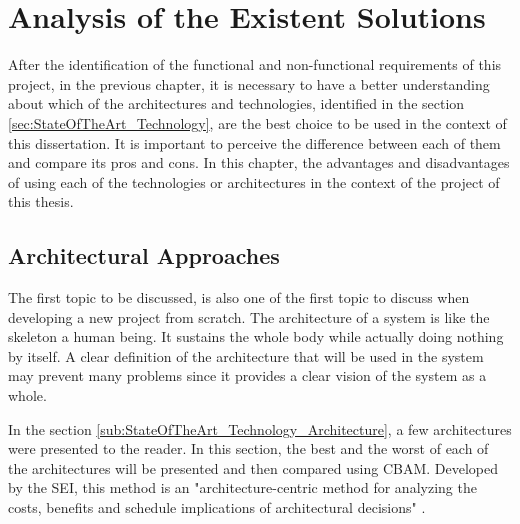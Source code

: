\chapter{Analysis of the Existent Solutions} %
\label{chap:existent_solutions_comparison}
After the identification of the functional and non-functional requirements of this project, in the previous chapter, it is necessary to have a better understanding about which of the architectures and technologies, identified in the section \ref{sec:StateOfTheArt_Technology}, are the best choice to be used in the context of this dissertation. It is important to perceive the difference between each of them and compare its pros and cons. In this chapter, the advantages and disadvantages of using each of the technologies or architectures in the context of the project of this thesis.


\section{Architectural Approaches}
\label{sub:architectural_approaches}
The first topic to be discussed, is also one of the first topic to discuss when developing a new project from scratch. The architecture of a system is like the skeleton a human being. It sustains the whole body while actually doing nothing by itself. A clear definition of the architecture that will be used in the system may prevent many problems since it provides a clear vision of the system as a whole. 
\par
In the section \ref{sub:StateOfTheArt_Technology_Architecture}, a few architectures were presented to the reader. In this section, the best and the worst of each of the architectures will be presented and then compared using \gls{CBAM}. Developed by the \gls{SEI}, this method is an "architecture-centric method for analyzing the costs, benefits and schedule implications of architectural decisions" \parencite{scenarioBasedArchEvaluation}.

